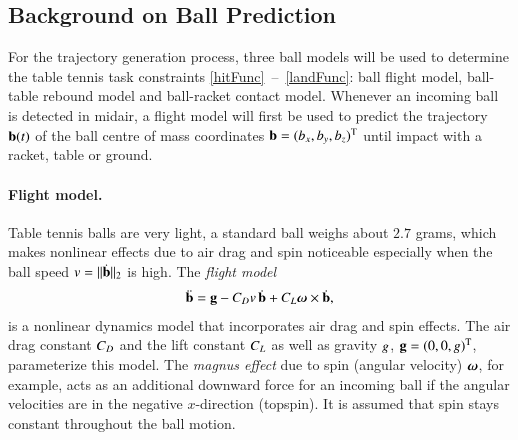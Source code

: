 \subsection{Background on Ball Prediction}\label{sectionPredict} %
 
For the trajectory generation process, three ball models will be used to determine the table tennis task constraints \mbox{\eqref{hitFunc} -- \eqref{landFunc}}: ball flight model, ball-table rebound model and ball-racket contact model. Whenever an incoming ball is detected in midair, a flight model will first be used to predict the trajectory $\boldsymbol{\mathrm{b}}(t)$ of the ball centre of mass coordinates $\boldsymbol{\mathrm{b}} = (b_x,b_y,b_z)^{\mathrm{T}}$ until impact with a racket, table or ground. 

\paragraph{Flight model.} Table tennis balls are very light, a standard ball weighs about $2.7$ grams, which makes nonlinear effects due to air drag and spin noticeable especially when the ball speed $v = \|\dot{\boldsymbol{\mathrm{b}}}\|_2$ is high. The \emph{flight model}~\citep{Nakashima10}
%
\begin{align}
\ddot{\boldsymbol{\mathrm{b}}} = \boldsymbol{\mathrm{g}} -C_{D}v \, \dot{\boldsymbol{\mathrm{b}}} + C_{L} \boldsymbol{\mathrm{\omega}} \times \dot{\boldsymbol{\mathrm{b}}}, \label{flightModel}
\end{align}
%
\noindent is a nonlinear dynamics model that incorporates air drag and spin effects. The air drag constant $C_{D}$ and the lift constant $C_{L}$ as well as gravity $g$, $\boldsymbol{\mathrm{g}} = (0,0,g)^{\mathrm{T}}$, parameterize this model. The \emph{magnus effect} due to spin (angular velocity) $\boldsymbol{\mathrm{\omega}}$, for example, acts as an additional downward force for an incoming ball if the angular velocities are in the negative $x$-direction (topspin). It is assumed that spin stays constant throughout the ball motion.
%
